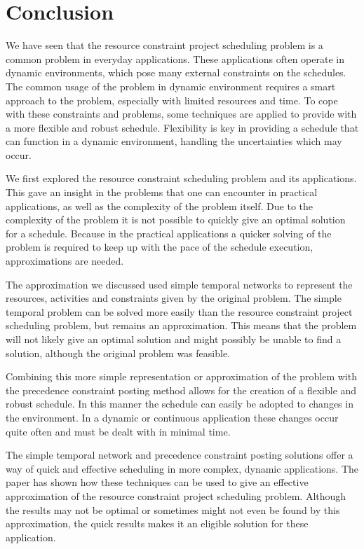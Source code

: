 \documentclass{article}
\theoremstyle{definition}
\begin{document}
\newpage
 
\section{Conclusion}

We have seen that the resource constraint project scheduling problem is a common problem in everyday applications.
These applications often operate in dynamic environments, which pose many external constraints on the schedules.
The common usage of the problem in dynamic environment requires a smart approach to the problem, especially with limited resources and time.
To cope with these constraints and problems, some techniques are applied to provide with a more flexible and robust schedule.
Flexibility is key in providing a schedule that can function in a dynamic environment, handling the uncertainties which may occur.

We first explored the resource constraint scheduling problem and its applications.
This gave an insight in the problems that one can encounter in practical applications, as well as the complexity of the problem itself.
Due to the complexity of the problem it is not possible to quickly give an optimal solution for a schedule.
Because in the practical applications a quicker solving of the problem is required to keep up with the pace of the schedule execution, approximations are needed.

The approximation we discussed used simple temporal networks to represent the resources, activities and constraints given by the original problem.
The simple temporal problem can be solved more easily than the resource constraint project scheduling problem, but remains an approximation.
This means that the problem will not likely give an optimal solution and might possibly be unable to find a solution, although the original problem was feasible.

Combining this more simple representation or approximation of the problem with the precedence constraint posting method allows for the creation of a flexible and robust schedule.
In this manner the schedule can easily be adopted to changes in the environment.
In a dynamic or continuous application these changes occur quite often and must be dealt with in minimal time.

The simple temporal network and precedence constraint posting solutions offer a way of quick and effective scheduling in more complex, dynamic applications.
The paper has shown how these techniques can be used to give an effective approximation of the resource constraint project scheduling problem.
Although the results may not be optimal or sometimes might not even be found by this approximation, the quick results makes it an eligible solution for these application.

\newpage


\end{document}
